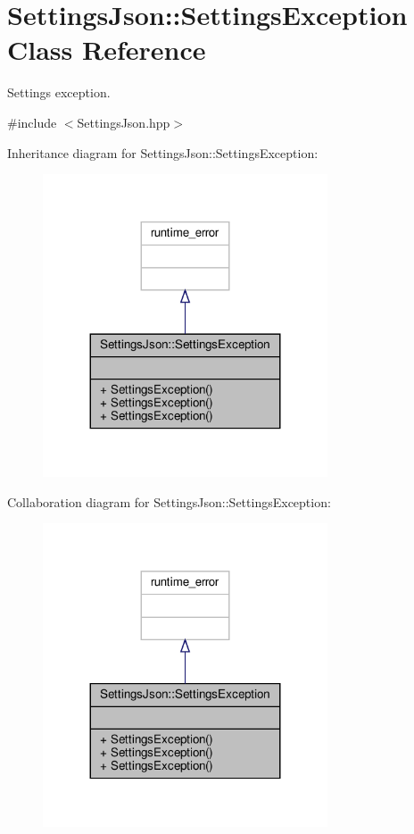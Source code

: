 \hypertarget{class_settings_json_1_1_settings_exception}{}\section{Settings\+Json\+:\+:Settings\+Exception Class Reference}
\label{class_settings_json_1_1_settings_exception}


Settings exception.  




{\ttfamily \#include $<$Settings\+Json.\+hpp$>$}



Inheritance diagram for Settings\+Json\+:\+:Settings\+Exception\+:
\nopagebreak
\begin{figure}[H]
\begin{center}
\leavevmode
\includegraphics[width=239pt]{class_settings_json_1_1_settings_exception__inherit__graph}
\end{center}
\end{figure}


Collaboration diagram for Settings\+Json\+:\+:Settings\+Exception\+:
\nopagebreak
\begin{figure}[H]
\begin{center}
\leavevmode
\includegraphics[width=239pt]{class_settings_json_1_1_settings_exception__coll__graph}
\end{center}
\end{figure}
